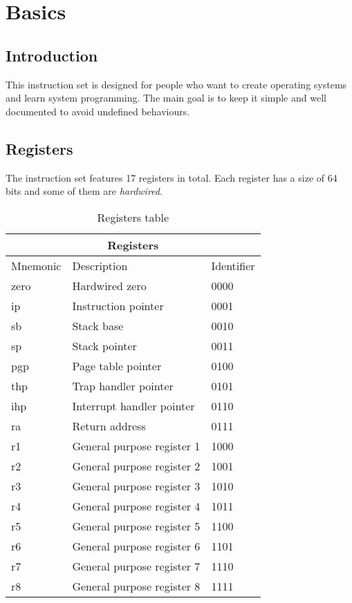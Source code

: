 \documentclass{article}
\begin{document}
\section{Basics}
\subsection{Introduction}
This instruction set is designed for people who want to create operating systems and learn system programming. The main goal is to keep it simple and well documented to avoid undefined behaviours.

\subsection{Registers}
The instruction set features 17 registers in total. Each register has a size of 64 bits and some of them are \textit{hardwired}.
\begin{table}[h!]
\centering
\begin{tabular} { | p{3cm} | | p{6cm} | p{2cm} |}
  \hline
  \multicolumn{3}{|c|}{Registers}\\
  \hline
  Mnemonic & Description & Identifier\\
  \hline
  zero & Hardwired zero & 0000\\
  ip & Instruction pointer & 0001\\
  sb & Stack base & 0010\\
  sp & Stack pointer & 0011\\
  pgp & Page table pointer & 0100\\
  thp & Trap handler pointer & 0101\\
  ihp & Interrupt handler pointer & 0110\\
  ra & Return address & 0111\\
  r1 & General purpose register 1 & 1000\\
  r2 & General purpose register 2 & 1001\\
  r3 & General purpose register 3 & 1010\\
  r4 & General purpose register 4 & 1011\\
  r5 & General purpose register 5 & 1100\\
  r6 & General purpose register 6 & 1101\\
  r7 & General purpose register 7 & 1110\\
  r8 & General purpose register 8 & 1111\\
  \hline
\end{tabular}
\caption{Registers table}
\end{table}
\end{document}
